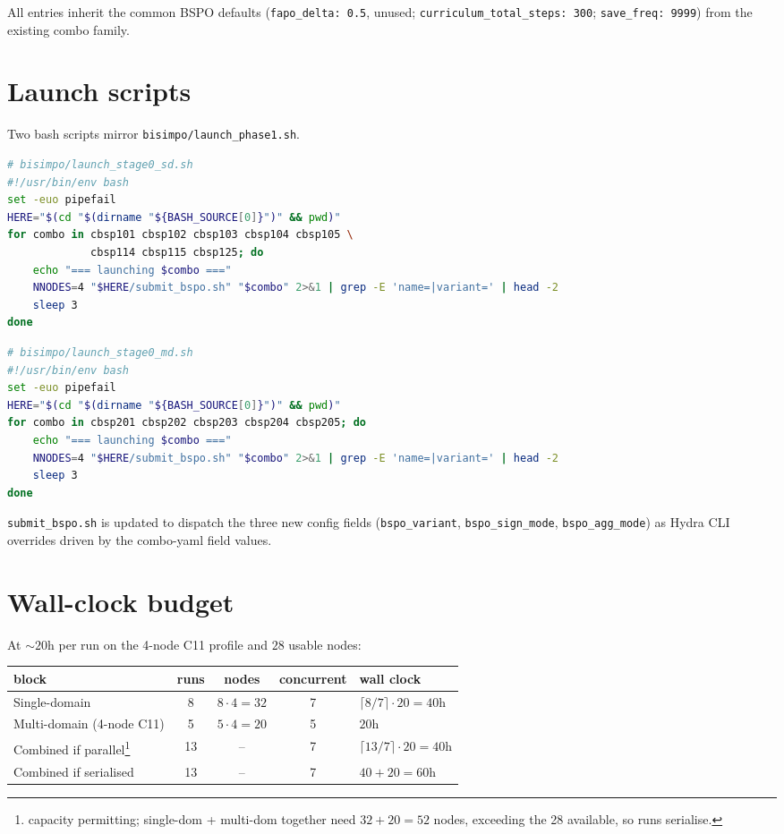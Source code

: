 \documentclass[11pt]{article}
\begin{document}
All entries inherit the common BSPO defaults
(\verb|fapo_delta: 0.5|, unused; \verb|curriculum_total_steps: 300|;
\verb|save_freq: 9999|) from the existing combo family.

\section{Launch scripts}

Two bash scripts mirror \verb|bisimpo/launch_phase1.sh|.

\begin{lstlisting}[language=bash]
# bisimpo/launch_stage0_sd.sh
#!/usr/bin/env bash
set -euo pipefail
HERE="$(cd "$(dirname "${BASH_SOURCE[0]}")" && pwd)"
for combo in cbsp101 cbsp102 cbsp103 cbsp104 cbsp105 \
             cbsp114 cbsp115 cbsp125; do
    echo "=== launching $combo ==="
    NNODES=4 "$HERE/submit_bspo.sh" "$combo" 2>&1 | grep -E 'name=|variant=' | head -2
    sleep 3
done
\end{lstlisting}

\begin{lstlisting}[language=bash]
# bisimpo/launch_stage0_md.sh
#!/usr/bin/env bash
set -euo pipefail
HERE="$(cd "$(dirname "${BASH_SOURCE[0]}")" && pwd)"
for combo in cbsp201 cbsp202 cbsp203 cbsp204 cbsp205; do
    echo "=== launching $combo ==="
    NNODES=4 "$HERE/submit_bspo.sh" "$combo" 2>&1 | grep -E 'name=|variant=' | head -2
    sleep 3
done
\end{lstlisting}

\verb|submit_bspo.sh| is updated to dispatch the three new config fields
(\verb|bspo_variant|, \verb|bspo_sign_mode|, \verb|bspo_agg_mode|) as
Hydra CLI overrides driven by the combo-yaml field values.

\section{Wall-clock budget}

At $\sim 20$h per run on the 4-node C11 profile and $28$ usable nodes:

\begin{center}
\renewcommand{\arraystretch}{1.25}
\begin{tabular}{l c c c l}
\toprule
block & runs & nodes & concurrent & wall clock \\
\midrule
Single-domain                            & 8 & $8\cdot 4 = 32$ & 7 & $\lceil 8/7\rceil\cdot 20 = 40$h \\
Multi-domain (4-node C11)                & 5 & $5\cdot 4 = 20$ & 5 & $20$h \\
Combined if parallel\footnote{capacity permitting; single-dom + multi-dom together need $32+20=52$ nodes, exceeding the 28 available, so runs serialise.}
                                         & 13 & -- & 7 & $\lceil 13/7\rceil\cdot 20 = 40$h \\
Combined if serialised                   & 13 & -- & 7 & $40 + 20 = 60$h \\
\bottomrule
\end{tabular}
\end{center}
\end{document}
